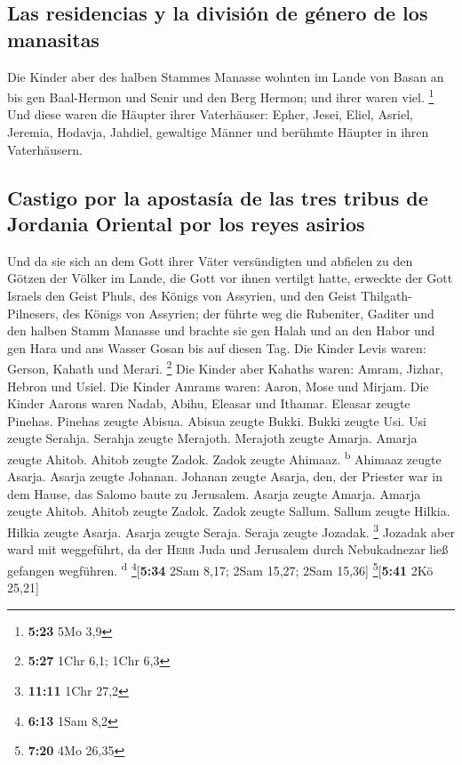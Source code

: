 \hypertarget{las-residencias-y-la-divisiuxf3n-de-guxe9nero-de-los-manasitas}{%
\subsection{Las residencias y la división de género de los
manasitas}\label{las-residencias-y-la-divisiuxf3n-de-guxe9nero-de-los-manasitas}}

 Die Kinder aber des halben Stammes Manasse wohnten im
Lande von Basan an bis gen Baal-Hermon und Senir und den Berg Hermon;
und ihrer waren viel. \footnote{\textbf{5:23} 5Mo 3,9} 
Und diese waren die Häupter ihrer Vaterhäuser: Epher, Jesei, Eliel,
Asriel, Jeremia, Hodavja, Jahdiel, gewaltige Männer und berühmte Häupter
in ihren Vaterhäusern.

\hypertarget{castigo-por-la-apostasuxeda-de-las-tres-tribus-de-jordania-oriental-por-los-reyes-asirios}{%
\subsection{Castigo por la apostasía de las tres tribus de Jordania
Oriental por los reyes
asirios}\label{castigo-por-la-apostasuxeda-de-las-tres-tribus-de-jordania-oriental-por-los-reyes-asirios}}

 Und da sie sich an dem Gott ihrer Väter versündigten und
abfielen zu den Götzen der Völker im Lande, die Gott vor ihnen vertilgt
hatte,  erweckte der Gott Israels den Geist Phuls, des
Königs von Assyrien, und den Geist Thilgath-Pilnesers, des Königs von
Assyrien; der führte weg die Rubeniter, Gaditer und den halben Stamm
Manasse und brachte sie gen Halah und an den Habor und gen Hara und ans
Wasser Gosan bis auf diesen Tag.  Die Kinder Levis waren:
Gerson, Kahath und Merari. \footnote{\textbf{5:27} 1Chr 6,1; 1Chr 6,3}
 Die Kinder aber Kahaths waren: Amram, Jizhar, Hebron und
Usiel.  Die Kinder Amrams waren: Aaron, Mose und Mirjam.
Die Kinder Aarons waren Nadab, Abihu, Eleasar und Ithamar.
 Eleasar zeugte Pinehas. Pinehas zeugte Abisua.
 Abisua zeugte Bukki. Bukki zeugte Usi. 
Usi zeugte Serahja. Serahja zeugte Merajoth.  Merajoth
zeugte Amarja. Amarja zeugte Ahitob.  Ahitob zeugte
Zadok. Zadok zeugte Ahimaaz. \textsuperscript{b}  Ahimaaz
zeugte Asarja. Asarja zeugte Johanan.  Johanan zeugte
Asarja, den, der Priester war in dem Hause, das Salomo baute zu
Jerusalem.  Asarja zeugte Amarja. Amarja zeugte Ahitob.
 Ahitob zeugte Zadok. Zadok zeugte Sallum.
 Sallum zeugte Hilkia. Hilkia zeugte Asarja.
 Asarja zeugte Seraja. Seraja zeugte Jozadak. \footnote{\textbf{11:11}
  1Chr 27,2}  Jozadak aber ward mit weggeführt, da der
\textsc{Herr} Juda und Jerusalem durch Nebukadnezar ließ gefangen
wegführen. \textsuperscript{d} \footnote{\textbf{6:13} 1Sam 8,2}{[}\textbf{5:34}
2Sam 8,17; 2Sam 15,27; 2Sam 15,36{]} \footnote{\textbf{7:20} 4Mo 26,35}{[}\textbf{5:41}
2Kö 25,21{]}

